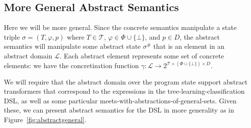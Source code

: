\subsection{More General Abstract Semantics}

Here we will be more general.
Since the concrete semantics manipulate a state triple $\sigma = (T, \varphi, p)$
where $T \in \mathcal{T}$, $\varphi \in \Phi \cup \{ \bot \}$, and $p \in D$,
the abstract semantics will manipulate some abstract state $\sigma^\#$
that is an element in an abstract domain $\mathcal{L}$.
Each abstract element represents some set of concrete elements:
we have the concretization function
$\gamma : \mathcal{L} \rightarrow 2^{\mathcal{T} \times (\Phi \cup \{\bot\}) \times D}$.

We will require that the abstract domain over the program state
support abstract transformers that correspond to the expressions
in the tree-learning-classification DSL,
as well as some particular meets-with-abstractions-of-general-sets.
Given these, we can present abstract semantics for the DSL in more generality
as in Figure~\ref{fig:abstractgeneral}.

